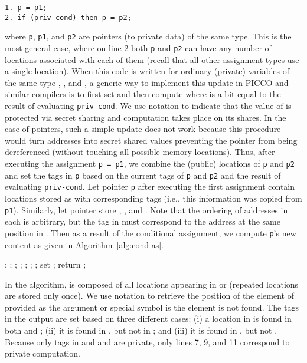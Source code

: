\documentclass[11pt]{article}
\begin{document}
{\small 
\begin{verbatim}
1. p = p1;
2. if (priv-cond) then p = p2;
\end{verbatim}}
\noindent where \texttt{p}, \texttt{p1}, and \texttt{p2} are pointers
(to private data) of the same type. This is the most general case,
where on line 2 both \texttt{p} and \texttt{p2} can have any number of
locations associated with each of them (recall that all other
assignment types use a single location). When this code is written for
ordinary (private) variables of the same type , , and , a
generic way to implement this update in PICCO and similar compilers is
to first set  and then compute  where  is a
bit equal to the result of evaluating \texttt{priv-cond}. We use
notation  to indicate that the value of  is protected via
secret sharing and computation takes place on its shares. In the case
of pointers, such a simple update does not work because this procedure
would turn addresses into secret shared values preventing the pointer
from being dereferenced (without touching all possible memory
locations). Thus, after executing the assignment \texttt{p = p1}, we
combine the (public) locations of \texttt{p} and \texttt{p2} and set
the tags in \texttt{p} based on the current tags of \texttt{p} and
\texttt{p2} and the result  of evaluating \texttt{priv-cond}. Let
pointer \texttt{p} after executing the first assignment contain
 locations stored as  with corresponding tags  (i.e., this information was copied from
\texttt{p1}). Similarly, let pointer  store , , and . Note that the ordering of addresses in
each  is arbitrary, but the tag  in  must correspond to the
address  at the same position  in . Then as a result of
the conditional assignment, we compute \texttt{p}'s new content as
given in Algorithm~\ref{alg:cond-as}.
\begin{algorithm}[h]
\caption{, } \label{alg:cond-as}
\begin{algorithmic}[1]
    \STATE ;
    \STATE ; 
    \STATE ;
    \STATE ;
    \STATE ;
    \ELSIF{()}
    \STATE ;
    \ELSE
    \STATE ;
    \ENDIF
    \ENDFOR
    \STATE set ;
    \STATE return ;
\end{algorithmic}
\end{algorithm}

In the algorithm,  is composed of all locations
appearing in  or  (repeated locations are stored only once).
We use notation  to retrieve the position of the element
of  provided as the argument or special symbol  is the
element is not found. The tags in the output  are set based on
three different cases: (i) a location in  is found in both 
and ; (ii) it is found in , but not in ; and (iii) it
is found in , but not . Because only tags in  and 
and  are private, only lines 7, 9, and 11 correspond to private
computation.
 
\end{document}
